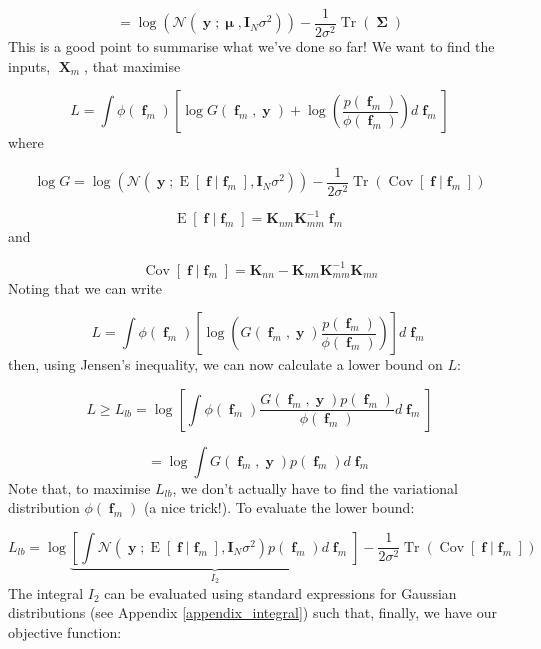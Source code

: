 \documentclass[a4paper, 11pt]{article}
\DeclareMathOperator{\Cov}{Cov}
\DeclareMathOperator{\E}{E}
\DeclareMathOperator{\Tr}{Tr}
\DeclareMathOperator{\X}{\boldsymbol{X}}
\DeclareMathOperator{\y}{\boldsymbol{y}}
\DeclareMathOperator{\f}{\boldsymbol{f}}
\DeclareMathOperator{\bmu}{\boldsymbol{\mu}}
\DeclareMathOperator{\bSigma}{\boldsymbol{\Sigma}}
\begin{document}
\begin{equation}
	= \log(\mathcal{N}(\y;\bmu,\boldsymbol{I}_N\sigma^2)) -\frac{1}{2\sigma^2}\Tr(\bSigma)
\end{equation}
This is a good point to summarise what we've done so far! We want to find the inputs, $\X_m$, that maximise 

\begin{equation}
	L = \int \phi(\f_m) \left[
		\log G(\f_m,\y) + \log \left(  \frac{p(\f_m)}{\phi(\f_m)} \right) d\f_m
	\right]
\end{equation}
where

\begin{equation}
	\log G = \log \left(  \mathcal{N}(\y;\E[\f|\f_m],\boldsymbol{I}_N\sigma^2) \right) -\frac{1}{2\sigma^2}\Tr\left( \Cov[\f|\f_m] \right)
\end{equation}

\begin{equation}
	\E[\f|\f_m] = \boldsymbol{K}_{nm} \boldsymbol{K}_{mm}^{-1} \f_m
\end{equation}
and

\begin{equation}
	\Cov[\f|\f_m] = \boldsymbol{K}_{nn} - \boldsymbol{K}_{nm}\boldsymbol{K}_{mm}^{-1}\boldsymbol{K}_{mn}
\end{equation}
Noting that we can write 

\begin{equation}
	L = \int \phi(\f_m) \left[
		\log \left( G(\f_m,\y)  \frac{p(\f_m)}{\phi(\f_m)} \right)
	\right] d\f_m
\end{equation}
then, using Jensen's inequality, we can now calculate a lower bound on $L$:

\begin{equation}
	L \geq L_{lb} = \log \left[  \int \phi(\f_m) \frac{G(\f_m,\y) p(\f_m)}{\phi(\f_m)}  d\f_m \right]
\end{equation}

\begin{equation}
	= \log \int G(\f_m,\y)p(\f_m) d\f_m
\end{equation}
Note that, to maximise $L_{lb}$, we don't actually have to find the variational distribution $\phi(\f_m)$ (a nice trick!). To evaluate the lower bound:

\begin{equation}
	L_{lb} = \log \underbrace{\left[ \int \mathcal{N}(\y;\E[\f|\f_m],\boldsymbol{I}_N \sigma^2) p(\f_m) d\f_m \right]}_{I_2} -\frac{1}{2\sigma^2} \Tr\left( \Cov[\f|\f_m] \right)
	\label{eq:kalman_integral}
\end{equation}
The integral $I_2$ can be evaluated using standard expressions for Gaussian distributions (see Appendix \ref{appendix_integral}) such that, finally, we have our objective function:
\end{document}
